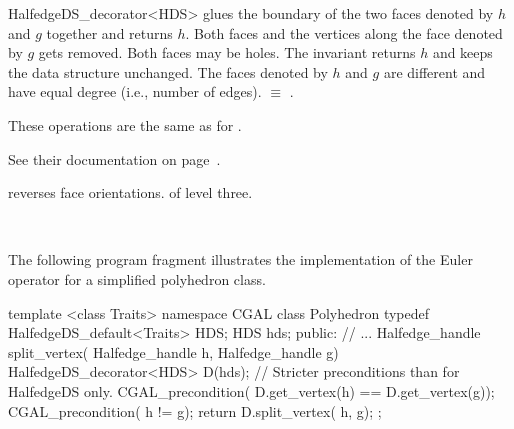 \begin{ccRefClass}{HalfedgeDS_decorator<HDS>}
   {glues the boundary of the two faces denoted by $h$ and $g$ together 
    and returns $h$. Both faces and the vertices along the face denoted
    by $g$ gets removed. Both faces may be holes. The invariant 
     returns $h$ and keeps the 
    data structure unchanged.
    \ccPrecond The faces denoted by $h$ and $g$ are different and have
    equal degree (i.e., number of edges).
      $\equiv$ 
    .} 



These operations are the same as for 
.
\begin{ccTexOnly}
    See their documentation on page~\pageref{pageHalfedgeDSconstDecoratorRef}.
\end{ccTexOnly}




    {reverses face orientations. \ccPrecond {} of level three.}


\ccSeeAlso

\\

\ccExample

The following program fragment illustrates the implementation of the
Euler operator  for a simplified polyhedron class.

\begin{ccExampleCode}
template <class Traits>
namespace CGAL {
    class Polyhedron {
        typedef HalfedgeDS_default<Traits> HDS;
        HDS hds;
    public:
        // ...
        Halfedge_handle split_vertex( Halfedge_handle h, Halfedge_handle g) {
            HalfedgeDS_decorator<HDS> D(hds);
            // Stricter preconditions than for HalfedgeDS only.
            CGAL_precondition( D.get_vertex(h) == D.get_vertex(g));
            CGAL_precondition( h != g);
            return D.split_vertex( h, g);
        }
    };
}
\end{ccExampleCode}

\end{ccRefClass}

\ccRefPageEnd

